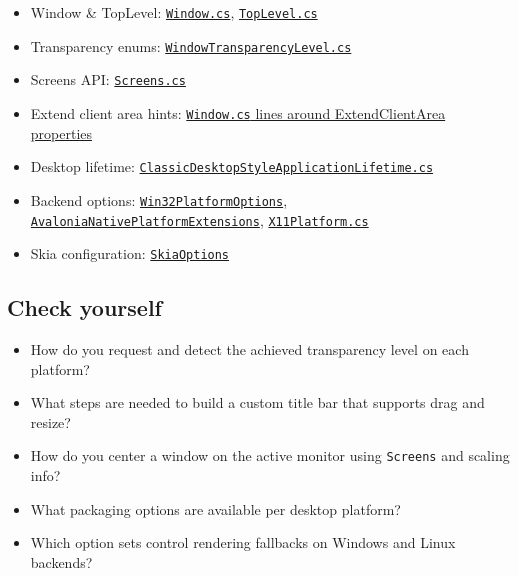 \begin{itemize}
\tightlist
\item
  Window \& TopLevel:
  \href{https://github.com/AvaloniaUI/Avalonia/blob/master/src/Avalonia.Controls/Window.cs}{\passthrough{\lstinline!Window.cs!}},
  \href{https://github.com/AvaloniaUI/Avalonia/blob/master/src/Avalonia.Controls/TopLevel.cs}{\passthrough{\lstinline!TopLevel.cs!}}
\item
  Transparency enums:
  \href{https://github.com/AvaloniaUI/Avalonia/blob/master/src/Avalonia.Controls/WindowTransparencyLevel.cs}{\passthrough{\lstinline!WindowTransparencyLevel.cs!}}
\item
  Screens API:
  \href{https://github.com/AvaloniaUI/Avalonia/blob/master/src/Avalonia.Controls/Screens.cs}{\passthrough{\lstinline!Screens.cs!}}
\item
  Extend client area hints:
  \href{https://github.com/AvaloniaUI/Avalonia/blob/master/src/Avalonia.Controls/Window.cs}{\passthrough{\lstinline!Window.cs!}
  lines around ExtendClientArea properties}
\item
  Desktop lifetime:
  \href{https://github.com/AvaloniaUI/Avalonia/blob/master/src/Avalonia.Controls/ApplicationLifetimes/ClassicDesktopStyleApplicationLifetime.cs}{\passthrough{\lstinline!ClassicDesktopStyleApplicationLifetime.cs!}}
\item
  Backend options:
  \href{https://github.com/AvaloniaUI/Avalonia/blob/master/src/Windows/Avalonia.Win32/Win32PlatformOptions.cs}{\passthrough{\lstinline!Win32PlatformOptions!}},
  \href{https://github.com/AvaloniaUI/Avalonia/blob/master/src/Avalonia.Native/AvaloniaNativePlatformExtensions.cs}{\passthrough{\lstinline!AvaloniaNativePlatformExtensions!}},
  \href{https://github.com/AvaloniaUI/Avalonia/blob/master/src/Avalonia.X11/X11Platform.cs}{\passthrough{\lstinline!X11Platform.cs!}}
\item
  Skia configuration:
  \href{https://github.com/AvaloniaUI/Avalonia/blob/master/src/Skia/Avalonia.Skia/SkiaOptions.cs}{\passthrough{\lstinline!SkiaOptions!}}
\end{itemize}

\subsection{Check yourself}\label{check-yourself-16}

\begin{itemize}
\tightlist
\item
  How do you request and detect the achieved transparency level on each
  platform?
\item
  What steps are needed to build a custom title bar that supports drag
  and resize?
\item
  How do you center a window on the active monitor using
  \passthrough{\lstinline!Screens!} and scaling info?
\item
  What packaging options are available per desktop platform?
\item
  Which option sets control rendering fallbacks on Windows and Linux
  backends?
\end{itemize}

